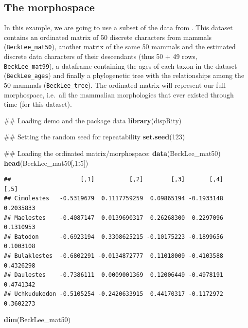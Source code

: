 \documentclass[]{book}
\newenvironment{Shaded}{\begin{snugshade}}{\end{snugshade}}
\newcommand{\KeywordTok}[1]{\textcolor[rgb]{0.13,0.29,0.53}{\textbf{#1}}}
\newcommand{\DecValTok}[1]{\textcolor[rgb]{0.00,0.00,0.81}{#1}}
\newcommand{\OperatorTok}[1]{\textcolor[rgb]{0.81,0.36,0.00}{\textbf{#1}}}
\newcommand{\NormalTok}[1]{#1}
\theoremstyle{definition}
\theoremstyle{definition}
\theoremstyle{remark}
\begin{document}
\subsection{The morphospace}\label{the-morphospace}

In this example, we are going to use a subset of the data from
\citep{beckancient2014}. This dataset contains an ordinated matrix of 50
discrete characters from mammals (\texttt{BeckLee\_mat50}), another
matrix of the same 50 mammals and the estimated discrete data characters
of their descendants (thus 50 + 49 rows, \texttt{BeckLee\_mat99}), a
dataframe containing the ages of each taxon in the dataset
(\texttt{BeckLee\_ages}) and finally a phylogenetic tree with the
relationships among the 50 mammals (\texttt{BeckLee\_tree}). The
ordinated matrix will represent our full morphospace, i.e.~all the
mammalian morphologies that ever existed through time (for this
dataset).

\begin{Shaded}
\begin{Highlighting}[]
\NormalTok{## Loading demo and the package data}
\KeywordTok{library}\NormalTok{(dispRity)}

\NormalTok{## Setting the random seed for repeatability}
\KeywordTok{set.seed}\NormalTok{(}\DecValTok{123}\NormalTok{)}

\NormalTok{## Loading the ordinated matrix/morphospace:}
\KeywordTok{data}\NormalTok{(BeckLee_mat50)}
\KeywordTok{head}\NormalTok{(BeckLee_mat50[,}\DecValTok{1}\OperatorTok{:}\DecValTok{5}\NormalTok{])}
\end{Highlighting}
\end{Shaded}

\begin{verbatim}
##                    [,1]          [,2]        [,3]       [,4]      [,5]
## Cimolestes   -0.5319679  0.1117759259  0.09865194 -0.1933148 0.2035833
## Maelestes    -0.4087147  0.0139690317  0.26268300  0.2297096 0.1310953
## Batodon      -0.6923194  0.3308625215 -0.10175223 -0.1899656 0.1003108
## Bulaklestes  -0.6802291 -0.0134872777  0.11018009 -0.4103588 0.4326298
## Daulestes    -0.7386111  0.0009001369  0.12006449 -0.4978191 0.4741342
## Uchkudukodon -0.5105254 -0.2420633915  0.44170317 -0.1172972 0.3602273
\end{verbatim}

\begin{Shaded}
\begin{Highlighting}[]
\KeywordTok{dim}\NormalTok{(BeckLee_mat50)}
\end{Highlighting}
\end{Shaded}
\end{document}

